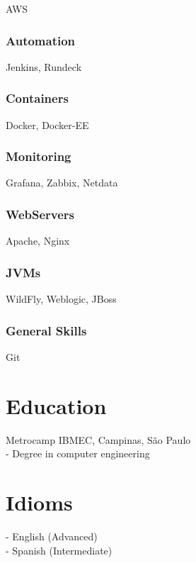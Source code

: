 \documentclass{article}
\begin{document}
AWS

\subsubsection{Automation}

Jenkins, Rundeck

\subsubsection{Containers}

Docker, Docker-EE

\subsubsection{Monitoring}

Grafana, Zabbix, Netdata

\subsubsection{WebServers}

Apache, Nginx

\subsubsection{JVMs}

WildFly, Weblogic, JBoss

\subsubsection{General Skills}

Git

\section{Education}

Metrocamp IBMEC, Campinas, São Paulo \\
- Degree in computer engineering

\section{Idioms}

- English (Advanced) \\
- Spanish (Intermediate)
\end{document}
